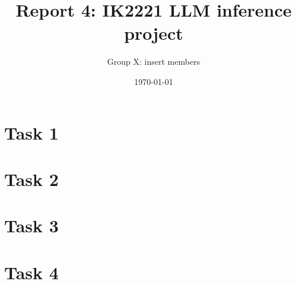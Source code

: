 \documentclass[a4paper, 11pt]{article}
\title{Report 4: IK2221 LLM inference project}
\author{Group X: insert members}
\date{\today{}}
\begin{document}
\maketitle


\section{Task 1}



\section{Task 2}

\section{Task 3}


\section{Task 4}
\end{document}
